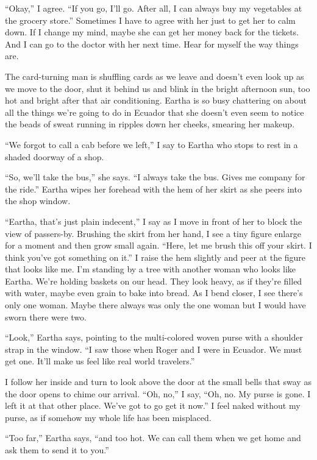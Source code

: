 \documentclass[
]{article}
\begin{document}
``Okay,'' I agree. ``If you go, I'll go. After all, I can always buy my
vegetables at the grocery store.'' Sometimes I have to agree with her
just to get her to calm down. If I change my mind, maybe she can get her
money back for the tickets. And I can go to the doctor with her next
time. Hear for myself the way things are.

The card-turning man is shuffling cards as we leave and doesn't even
look up as we move to the door, shut it behind us and blink in the
bright afternoon sun, too hot and bright after that air conditioning.
Eartha is so busy chattering on about all the things we're going to do
in Ecuador that she doesn't even seem to notice the beads of sweat
running in ripples down her cheeks, smearing her makeup.

``We forgot to call a cab before we left,'' I say to Eartha who stops to
rest in a shaded doorway of a shop.

``So, we'll take the bus,'' she says. ``I always take the bus. Gives me
company for the ride.'' Eartha wipes her forehead with the hem of her
skirt as she peers into the shop window.

``Eartha, that's just plain indecent,'' I say as I move in front of her
to block the view of passers-by. Brushing the skirt from her hand, I see
a tiny figure enlarge for a moment and then grow small again. ``Here,
let me brush this off your skirt. I think you've got something on it.''
I raise the hem slightly and peer at the figure that looks like me. I'm
standing by a tree with another woman who looks like Eartha. We're
holding baskets on our head. They look heavy, as if they're filled with
water, maybe even grain to bake into bread. As I bend closer, I see
there's only one woman. Maybe there always was only the one woman but I
would have sworn there were two.

``Look,'' Eartha says, pointing to the multi-colored woven purse with a
shoulder strap in the window. ``I saw those when Roger and I were in
Ecuador. We must get one. It'll make us feel like real world
travelers.''

I follow her inside and turn to look above the door at the small bells
that sway as the door opens to chime our arrival. ``Oh, no,'' I say,
``Oh, no. My purse is gone. I left it at that other place. We've got to
go get it now.'' I feel naked without my purse, as if somehow my whole
life has been misplaced.

``Too far,'' Eartha says, ``and too hot. We can call them when we get
home and ask them to send it to you.''
\end{document}
